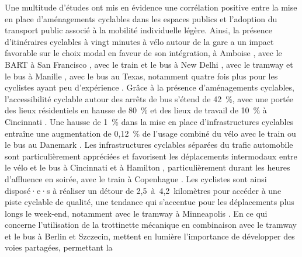 \begin{refsegment}
Une multitude d'études ont mis en évidence une corrélation positive entre la mise en place d'aménagements cyclables dans les espaces publics et l'adoption du transport public associé à la mobilité individuelle légère. Ainsi, la présence d'itinéraires cyclables à vingt minutes à vélo autour de la gare a un impact favorable sur le choix modal en faveur de son intégration, à Amboise \textcolor{blue}{\autocite[751]{midenet_modal_2018}}, avec le \acrfull{BART} à San Francisco \textcolor{blue}{\autocite[93]{cervero_bike-and-ride_2013}}, avec le train et le bus à New Delhi \textcolor{blue}{\autocite[38]{mohanty_effect_2017}}, avec le tramway et le bus à Manille \textcolor{blue}{\autocite[250]{fillone_i_2018}}, avec le bus au Texas, notamment quatre fois plus pour les cyclistes ayant peu d'expérience \textcolor{blue}{\autocite[91]{taylor_analysis_1996}}. Grâce à la présence d'aménagements cyclables, l'accessibilité cyclable autour des arrêts de bus s'étend de 42~\%, avec une portée des lieux résidentiels en hausse de 80~\% et des lieux de travail de 10~\% à Cincinnati \textcolor{blue}{\autocite[8]{zuo_determining_2018}}. Une hausse de 1~\% dans la mise en place d'infrastructures cyclables entraîne une augmentation de 0,12~\% de l'usage combiné du vélo avec le train ou le bus au Danemark \textcolor{blue}{\autocite[42]{nielsen_bikeability_2018}}. Les infrastructures cyclables séparées du trafic automobile sont particulièrement appréciées et favorisent les déplacements intermodaux entre le vélo et le bus à Cincinnati \textcolor{blue}{\autocite[67]{zuo_bikeway_2019}} et à Hamilton \textcolor{blue}{\autocite[87]{zuo_incorporating_2021}}, particulièrement durant les heures d'affluence en soirée, avec le train à Copenhague \textcolor{blue}{\autocite[19]{halldorsdottir_home-end_2017}}. Les cyclistes sont ainsi disposé·e·s à réaliser un \gls{détour} de 2,5~à~4,2~kilomètres pour accéder à une piste cyclable de qualité, une tendance qui s'accentue pour les déplacements plus longs le week-end, notamment avec le tramway à Minneapolis \textcolor{blue}{\autocite[616]{krizek_detailed_2007}}. En ce qui concerne l'utilisation de la trottinette mécanique en combinaison avec le tramway et le bus à Berlin et Szczecin, \textcolor{blue}{\textcite[7]{kostrzewska_towards_2017}} mettent en lumière l'importance de développer des voies partagées, permettant la 
\end{refsegment}
